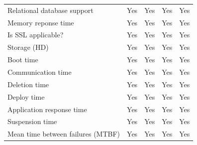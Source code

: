 \documentclass[conference]{IEEEtran}
\begin{document}
\begin{table}[]
\begin{tabular}{@{}lcccc@{}}
Relational database support                         & Yes                                     & Yes                                     & Yes                                     & Yes                         \\
Memory reponse time                        & Yes                                     & Yes                                     & Yes                                     & Yes                         \\
Is SSL applicable?                                    & Yes                                     & Yes                                     & Yes                                     & Yes                         \\
Storage (HD)        & Yes                                     & Yes                                     & Yes                                     & Yes                         \\
Boot time                                     & Yes                                     & Yes                                     & Yes                                     & Yes                         \\
Communication time                              & Yes                                     & Yes                                     & Yes                                     & Yes                         \\
Deletion time                                  & Yes                                     & Yes                                     & Yes                                     & Yes                         \\
Deploy time                              & Yes                                     & Yes                                     & Yes                                     & Yes                         \\
Application response time                     & Yes                                     & Yes                                     & Yes                                     & Yes                         \\
Suspension time                                & Yes                                     & Yes                                     & Yes                                     & Yes                         \\
Mean time between failures (MTBF)                   & Yes                                     & Yes                                     & Yes                                     & Yes                         \\

\end{tabular}
\end{table}
\end{document}
